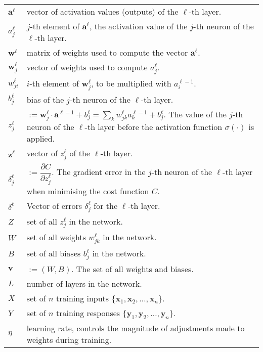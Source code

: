 \begin{tabular}{p{1cm}p{13cm}}
$\mathbf{a}^\ell$ & vector of activation values (outputs) of the $\ell$-th layer.\\
$a_j^\ell$ & $j$-th element of $\mathbf{a}^\ell$, the activation value of the $j$-th neuron of the $\ell$-th layer.\\
$\mathbf{w}^\ell$ & matrix of weights used to compute the vector $\mathbf{a}^\ell$.\\
$\mathbf{w}^\ell_j$ & vector of weights used to compute $a_j^\ell$.\\
$w_{ji}^\ell$ & $i$-th element of $\mathbf{w}^\ell_j$, to be multiplied with $a_i^{\ell-1}$.\\
$b_j^\ell$ & bias of the $j$-th neuron of the $\ell$-th layer.\\
$z_j^\ell$ & $:= \mathbf{w}_j^\ell\cdot \mathbf{a}^{\ell-1} + b_j^\ell= \sum_k w_{jk}^\ell a_k^{\ell-1} + b_j^\ell$. The value of the $j$-th neuron of the $\ell$-th layer before the activation function $\sigma(\cdot)$ is applied.\\
$\mathbf{z}^\ell$ & vector of $z_j^\ell$ of the $\ell$-th layer.\\
$\delta_j^\ell$ & $:=\dfrac{\partial C}{\partial z_j^\ell}$. The gradient error in the $j$-th neuron of the $\ell$-th layer when minimising the cost function $C$.\\
$\delta^\ell$ & Vector of errors $\delta_j^\ell$ for the $\ell$-th layer.\\
$Z$ & set of all $z_j^\ell$ in the network. \\
$W$ & set of all weights $w_{jk}^\ell$ in the network.\\
$B$ & set of all biases $b_j^\ell$ in the network. \\
$\mathbf{v}$ & $:= (W,B)$. The set of all weights and biases.\\
$L$ & number of layers in the network.\\
$X$ & set of $n$ training inputs $\{\mathbf{x}_1, \mathbf{x}_2, \ldots, \mathbf{x}_n\}$. \\
$Y$ & set of $n$ training responses $\{\mathbf{y}_1, \mathbf{y}_2, \ldots, \mathbf{y}_n\}$.\\
$\eta$ & learning rate, controls the magnitude of adjustments made to weights during training.
\end{tabular}


